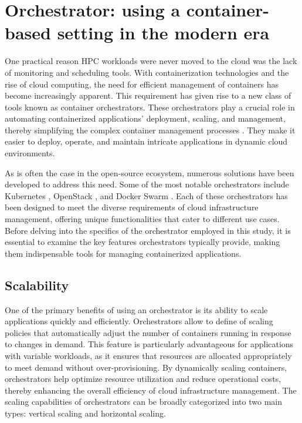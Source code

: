 \section{Orchestrator: using a container-based setting in the modern era}
\label{sec:chpt1-orchestrator}

One practical reason HPC workloads were never moved to the cloud was the lack of
monitoring and scheduling  tools.
With containerization technologies and the rise of cloud computing, the need for
efficient management of containers has become increasingly apparent.
This requirement has given rise to a new class of tools known as container
orchestrators.
These orchestrators play a crucial role in automating containerized
applications' deployment, scaling, and management, thereby simplifying the
complex container management processes \cite{Rodriguez2018}.
They make it easier to deploy, operate, and maintain intricate applications in
dynamic cloud environments.

As is often the case in the open-source ecosystem, numerous solutions have been
developed to address this need.
Some of the most notable orchestrators include Kubernetes
\cite{bookofkubernetes}, OpenStack \cite{Lima2017}, and Docker Swarm
\cite{Singh2023}.
Each of these orchestrators has been designed to meet the diverse requirements
of cloud infrastructure management, offering unique functionalities that cater
to different use cases.
Before delving into the specifics of the orchestrator employed in this study, it
is essential to examine the key features orchestrators typically provide, making
them indispensable tools for managing containerized applications.

\subsection{Scalability}

One of the primary benefits of using an orchestrator is its ability to scale
applications quickly and efficiently.
Orchestrators allow to define of scaling policies that automatically adjust the
number of containers running in response to changes in demand.
This feature is particularly advantageous for applications with variable
workloads, as it ensures that resources are allocated appropriately to meet
demand without over-provisioning.
By dynamically scaling containers, orchestrators help optimize resource
utilization and reduce operational costs, thereby enhancing the overall
efficiency of cloud infrastructure management.
The scaling capabilities of orchestrators can be broadly categorized into two
main types: vertical scaling and horizontal scaling.

